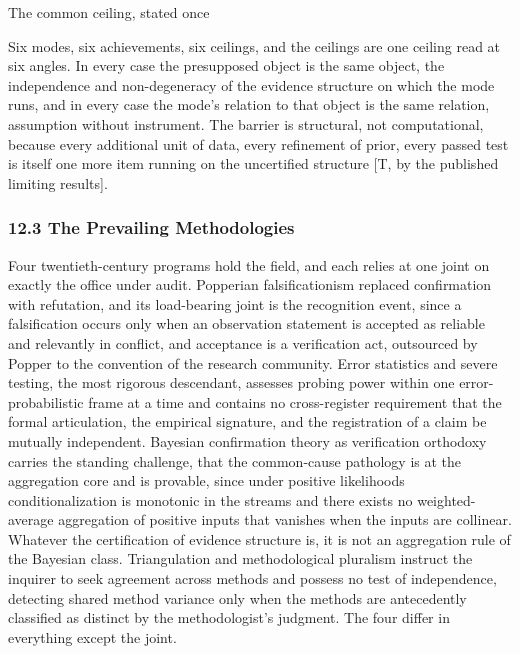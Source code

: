 \documentclass[10pt,twocolumn]{article}
\begin{document}
\begin{jbox}{The common ceiling, stated once}

Six modes, six achievements, six ceilings, and the ceilings are one
ceiling read at six angles. In every case the presupposed object is the
same object, the independence and non-degeneracy of the evidence
structure on which the mode runs, and in every case the mode's relation
to that object is the same relation, assumption without instrument. The
barrier is structural, not computational, because every additional unit
of data, every refinement of prior, every passed test is itself one more
item running on the uncertified structure {[}T, by the published
limiting results{]}.

\end{jbox}

\hypertarget{the-prevailing-methodologies}{%
\subsubsection{12.3 The Prevailing
Methodologies}\label{the-prevailing-methodologies}}

Four twentieth-century programs hold the field, and each relies at one
joint on exactly the office under audit. Popperian falsificationism
replaced confirmation with refutation, and its load-bearing joint is the
recognition event, since a falsification occurs only when an observation
statement is accepted as reliable and relevantly in conflict, and
acceptance is a verification act, outsourced by Popper to the convention
of the research community. Error statistics and severe testing, the most
rigorous descendant, assesses probing power within one
error-probabilistic frame at a time and contains no cross-register
requirement that the formal articulation, the empirical signature, and
the registration of a claim be mutually independent. Bayesian
confirmation theory as verification orthodoxy carries the standing
challenge, that the common-cause pathology is at the aggregation core
and is provable, since under positive likelihoods conditionalization is
monotonic in the streams and there exists no weighted-average
aggregation of positive inputs that vanishes when the inputs are
collinear. Whatever the certification of evidence structure is, it is
not an aggregation rule of the Bayesian class. Triangulation and
methodological pluralism instruct the inquirer to seek agreement across
methods and possess no test of independence, detecting shared method
variance only when the methods are antecedently classified as distinct
by the methodologist's judgment. The four differ in everything except
the joint.
\end{document}

